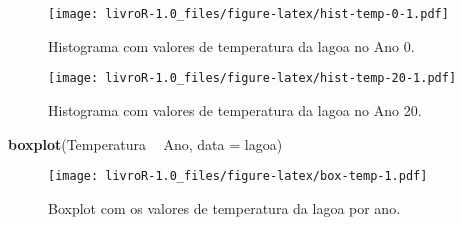 \documentclass[titlepage, oneside, openany, a4paper]{book}
\newenvironment{Shaded}{\begin{snugshade}}{\end{snugshade}}
\newcommand{\DataTypeTok}[1]{\textcolor[rgb]{0.13,0.29,0.53}{#1}}
\newcommand{\DecValTok}[1]{\textcolor[rgb]{0.00,0.00,0.81}{#1}}
\newcommand{\KeywordTok}[1]{\textcolor[rgb]{0.13,0.29,0.53}{\textbf{#1}}}
\newcommand{\NormalTok}[1]{#1}
\newcommand{\OperatorTok}[1]{\textcolor[rgb]{0.81,0.36,0.00}{\textbf{#1}}}
\newcommand{\StringTok}[1]{\textcolor[rgb]{0.31,0.60,0.02}{#1}}
\begin{document}
\begin{Shaded}
\end{Shaded}

\begin{figure}
\centering
\texttt{[image: livroR-1.0\_files/figure-latex/hist-temp-0-1.pdf]}
\caption{\label{fig:hist-temp-0}Histograma com valores de temperatura da lagoa no Ano 0.}
\end{figure}

\begin{Shaded}
\end{Shaded}

\begin{figure}
\centering
\texttt{[image: livroR-1.0\_files/figure-latex/hist-temp-20-1.pdf]}
\caption{\label{fig:hist-temp-20}Histograma com valores de temperatura da lagoa no Ano 20.}
\end{figure}

\begin{Shaded}
\begin{Highlighting}[]
\KeywordTok{boxplot}\NormalTok{(Temperatura }\OperatorTok{~}\StringTok{ }\NormalTok{Ano, }\DataTypeTok{data =}\NormalTok{ lagoa)}
\end{Highlighting}
\end{Shaded}

\begin{figure}
\centering
\texttt{[image: livroR-1.0\_files/figure-latex/box-temp-1.pdf]}
\caption{\label{fig:box-temp}Boxplot com os valores de temperatura da lagoa por ano.}
\end{figure}
\end{document}
